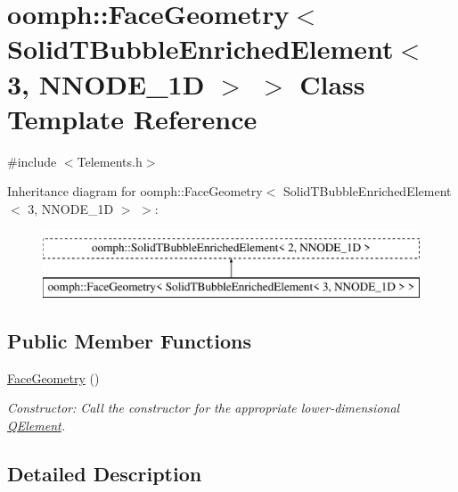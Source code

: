 \hypertarget{classoomph_1_1FaceGeometry_3_01SolidTBubbleEnrichedElement_3_013_00_01NNODE__1D_01_4_01_4}{}\section{oomph\+:\+:Face\+Geometry$<$ Solid\+T\+Bubble\+Enriched\+Element$<$ 3, N\+N\+O\+D\+E\+\_\+1D $>$ $>$ Class Template Reference}
\label{classoomph_1_1FaceGeometry_3_01SolidTBubbleEnrichedElement_3_013_00_01NNODE__1D_01_4_01_4}


{\ttfamily \#include $<$Telements.\+h$>$}

Inheritance diagram for oomph\+:\+:Face\+Geometry$<$ Solid\+T\+Bubble\+Enriched\+Element$<$ 3, N\+N\+O\+D\+E\+\_\+1D $>$ $>$\+:\begin{figure}[H]
\begin{center}
\leavevmode
\includegraphics[height=2.000000cm]{classoomph_1_1FaceGeometry_3_01SolidTBubbleEnrichedElement_3_013_00_01NNODE__1D_01_4_01_4}
\end{center}
\end{figure}
\subsection*{Public Member Functions}
\begin{DoxyCompactItemize}
\item 
\hyperlink{classoomph_1_1FaceGeometry_3_01SolidTBubbleEnrichedElement_3_013_00_01NNODE__1D_01_4_01_4_a04e1f56dbc0cd3cc7c25dab6d5cc8517}{Face\+Geometry} ()
\begin{DoxyCompactList}\small\item\em Constructor\+: Call the constructor for the appropriate lower-\/dimensional \hyperlink{classoomph_1_1QElement}{Q\+Element}. \end{DoxyCompactList}\end{DoxyCompactItemize}


\subsection{Detailed Description}
